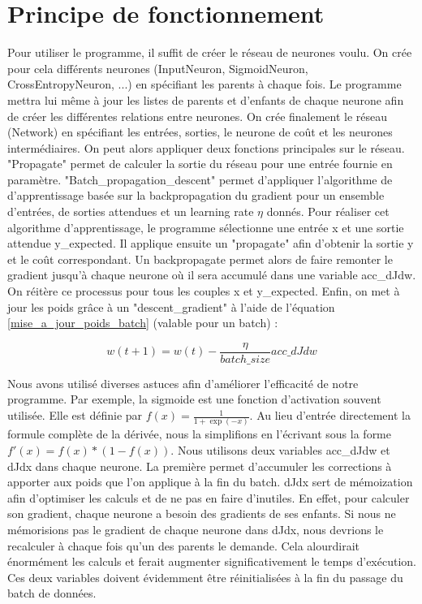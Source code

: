 \documentclass{report}
\begin{document}
\section{Principe de fonctionnement}
Pour utiliser le programme, il suffit de créer le réseau de neurones voulu. On crée pour cela différents neurones (InputNeuron, SigmoidNeuron, CrossEntropyNeuron, ...) en spécifiant les parents à chaque fois. Le programme mettra lui même à jour les listes de parents et d'enfants de chaque neurone afin de créer les différentes relations entre neurones. On crée finalement le réseau (Network) en spécifiant les entrées, sorties, le neurone de coût et les neurones intermédiaires.
On peut alors appliquer deux fonctions principales sur le réseau. "Propagate" permet de calculer la sortie du réseau pour une entrée fournie en paramètre. "Batch\_propagation\_descent" permet d'appliquer l'algorithme de d'apprentissage basée sur la backpropagation du gradient pour un ensemble d'entrées, de sorties attendues et un learning rate $\eta$ donnés. 
Pour réaliser cet algorithme d'apprentissage, le programme sélectionne une entrée x et une sortie attendue y\_expected. Il applique ensuite un "propagate" afin d'obtenir la sortie y et le coût correspondant. Un backpropagate permet alors de faire remonter le gradient jusqu'à chaque neurone où il sera accumulé dans une variable acc\_dJdw. On réitère ce processus pour tous les couples x et y\_expected. Enfin, on met à jour les poids grâce à un "descent\_gradient" à l'aide de l'équation \ref{mise_a_jour_poids_batch} (valable pour un batch) :

\begin{equation}
w(t+1) = w(t) - \frac{\eta}{batch\_size}acc\_dJdw
\label{mise_a_jour_poids_batch}
\end{equation}

Nous avons utilisé diverses astuces afin d'améliorer l'efficacité de notre programme. Par exemple, la sigmoide est une fonction d'activation souvent utilisée. Elle est définie par $f(x) = \frac{1}{1+\exp(-x)}$. Au lieu d'entrée directement la formule complète de la dérivée, nous la simplifions en l'écrivant sous la forme $f'(x) = f(x) * (1 - f(x))$.
Nous utilisons deux variables acc\_dJdw et dJdx dans chaque neurone. La première permet d'accumuler les corrections à apporter aux poids que l'on applique à la fin du batch. dJdx sert de mémoization afin d'optimiser les calculs et de ne pas en faire d'inutiles. En effet, pour calculer son gradient, chaque neurone a besoin des gradients de ses enfants. Si nous ne mémorisions pas le gradient de chaque neurone dans dJdx, nous devrions le recalculer à chaque fois qu'un des parents le demande. Cela alourdirait énormément les calculs et ferait augmenter significativement le temps d'exécution. Ces deux variables doivent évidemment être réinitialisées à la fin du passage du batch de données.
\end{document}
